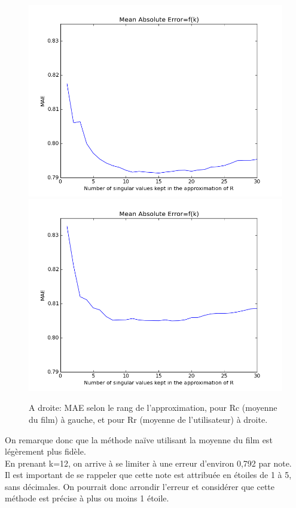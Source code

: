 \documentclass[12pt,a4paper]{article}
\begin{document}
\begin{figure}[h!]
	\includegraphics[scale=0.38]{MAE-By-Movie.png}
	\includegraphics[scale=0.38]{MAE-By-User.png}
	\caption{A droite: MAE selon le rang de l'approximation, pour Rc (moyenne du film) à gauche, et pour Rr (moyenne de l'utilisateur) à droite.}
\end{figure}

On remarque donc que la méthode naïve utilisant la moyenne du film est légèrement plus fidèle.\\
En prenant k=12, on arrive à se limiter à une erreur d'environ 0,792 par note.\\
Il est important de se rappeler que cette note est attribuée en étoiles de 1 à 5, sans décimales. On pourrait donc arrondir l'erreur et considérer que cette méthode est précise à plus ou moins 1 étoile.\\
\end{document}
